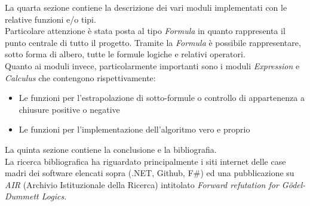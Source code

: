 \documentclass{oist}
\begin{document}
La quarta sezione contiene la descrizione dei vari moduli implementati con le relative funzioni e/o tipi. \\
Particolare attenzione è stata posta al tipo \textit{Formula} in quanto rappresenta il punto centrale di tutto il progetto. Tramite la \textit{Formula} è possibile rappresentare, sotto forma di albero, tutte le formule logiche e relativi operatori. \\
Quanto ai moduli invece, particolarmente importanti sono i moduli \textit{Expression} e \textit{Calculus} che contengono rispettivamente:
\begin{itemize}
    \item Le funzioni per l'estrapolazione di sotto-formule o controllo di appartenenza a chiusure positive o negative
    \item Le funzioni per l'implementazione dell'algoritmo vero e proprio
\end{itemize}

La quinta sezione contiene la conclusione e la bibliografia. \\
La ricerca bibliografica ha riguardato principalmente i siti internet delle case madri dei software elencati sopra (.NET, Github, F\#) ed una pubblicazione su \textit{AIR} (Archivio Istituzionale della Ricerca) intitolato \textit{Forward refutation for G\"odel-Dummett Logics}. \\
\end{document}
